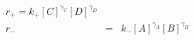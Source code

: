 \begin{eqnarray}
r_+  =  k_+[C]^{\gamma_C}[D]^{\gamma_D} \\
r_- & = & k_-[A]^{\gamma_A}[B]^{\gamma_B} \\
\end{eqnarray}
